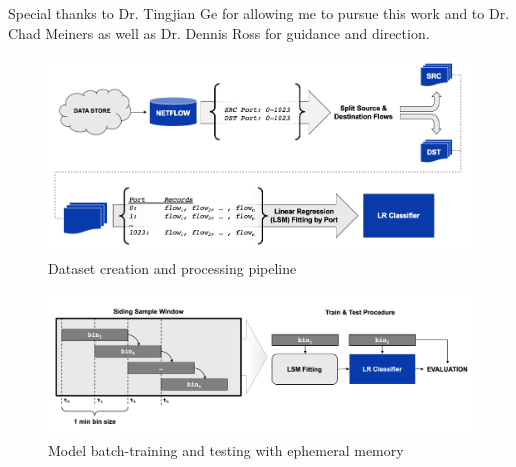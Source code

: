 Special thanks to Dr. Tingjian Ge for allowing me to pursue this work and to Dr. Chad Meiners as well as Dr. Dennis Ross for guidance and direction.

\begin{figure}
	\centering
	\includegraphics[width=15cm]{paperplots/process.png}
	\caption{Dataset creation and processing pipeline}
	\label{fig:processing}
\end{figure}

\begin{figure}
	\centering
	\includegraphics[width=15cm]{paperplots/model.png}
	\caption{Model batch-training and testing with ephemeral memory}
	\label{fig:model}
\end{figure}
